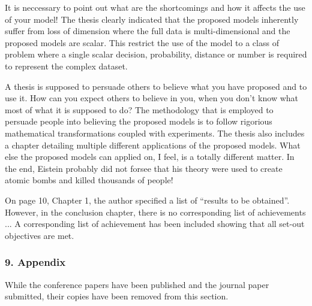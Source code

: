 \replyToComment
    {
      It is neccessary to point out what are the shortcomings and how it affects the use of your model!
    }
    {
      The thesis clearly indicated that the proposed models inherently suffer from loss of dimension where the full data is multi-dimensional and the proposed models are scalar.
      This restrict the use of the model to a class of problem where a single scalar decision, probability, distance or number is required to represent the complex dataset.
    }

\replyToComment
    {
      A thesis is supposed to persuade others to believe what you have proposed and to use it.
      How can you expect others to believe in you, when you don't know what most of what it is supposed to do?
    }
    {
      The methodology that is employed to persuade people into believing the proposed models is to follow rigorious mathematical transformations coupled with experiments.
      The thesis also includes a chapter detailing multiple different applications of the proposed models.
      What else the proposed models can applied on, I feel, is a totally different matter.
      In the end, Eistein probably did not forsee that his theory were used to create atomic bombs and killed thousands of people!
    }

\replyToComment
    {
      On page 10, Chapter 1, the author specified a list of ``results to be obtained''.
      However, in the conclusion chapter, there is no corresponding list of achievements ...
    }
    {
      A corresponding list of achievement has been included showing that all set-out objectives are met.
    }
    
%

\subsubsection*{9. Appendix}

While the conference papers have been published and the journal paper submitted,
  their copies have been removed from this section.



